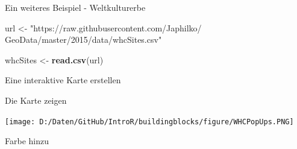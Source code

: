 \documentclass[ignorenonframetext,]{beamer}
\newenvironment{Shaded}{\begin{snugshade}}{\end{snugshade}}
\newcommand{\KeywordTok}[1]{\textcolor[rgb]{0.26,0.66,0.93}{\textbf{#1}}}
\newcommand{\DataTypeTok}[1]{\textcolor[rgb]{0.74,0.68,0.62}{\underline{#1}}}
\newcommand{\StringTok}[1]{\textcolor[rgb]{0.02,0.61,0.04}{#1}}
\newcommand{\CommentTok}[1]{\textcolor[rgb]{0.00,0.40,1.00}{\textit{#1}}}
\newcommand{\OperatorTok}[1]{\textcolor[rgb]{0.74,0.68,0.62}{#1}}
\newcommand{\NormalTok}[1]{\textcolor[rgb]{0.74,0.68,0.62}{#1}}
\begin{document}
\begin{frame}[fragile]{Ein weiteres Beispiel - Weltkulturerbe}

\begin{Shaded}
\begin{Highlighting}[]
\NormalTok{url <-}\StringTok{ "https://raw.githubusercontent.com/Japhilko/}
\StringTok{GeoData/master/2015/data/whcSites.csv"}

\NormalTok{whcSites <-}\StringTok{ }\KeywordTok{read.csv}\NormalTok{(url) }
\end{Highlighting}
\end{Shaded}

\end{frame}

\begin{frame}[fragile]{Eine interaktive Karte erstellen}

\begin{Shaded}
\end{Shaded}

\end{frame}

\begin{frame}{Die Karte zeigen}

\texttt{[image: D:/Daten/GitHub/IntroR/buildingblocks/figure/WHCPopUps.PNG]}

\end{frame}

\begin{frame}[fragile]{Farbe hinzu}

\begin{Shaded}
\end{Shaded}

\end{frame}
\end{document}
